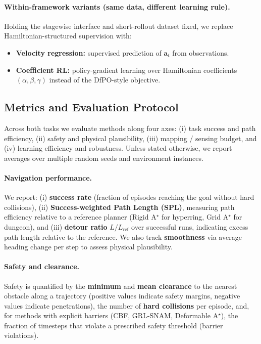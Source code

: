 \paragraph{Within-framework variants (same data, different learning rule).}
Holding the stagewise interface and short-rollout dataset fixed, we replace Hamiltonian-structured supervision with:
\begin{itemize}
    \item \textbf{Velocity regression:} supervised prediction of $\mathbf{a}_t$ from observations.
    \item \textbf{Coefficient RL:} policy-gradient learning over Hamiltonian coefficients $(\alpha,\beta,\gamma)$ instead of the DfPO-style objective.
\end{itemize}


\subsection{Metrics and Evaluation Protocol}
\label{subsec:metrics_protocol}

Across both tasks we evaluate methods along four axes:
(i) task success and path efficiency,
(ii) safety and physical plausibility,
(iii) mapping / sensing budget, and
(iv) learning efficiency and robustness.
Unless stated otherwise, we report averages over multiple random seeds and environment instances.

\paragraph{Navigation performance.}
We report:
(i) \textbf{success rate} (fraction of episodes reaching the goal without hard collisions),
(ii) \textbf{Success-weighted Path Length (SPL)}, measuring path efficiency relative to a reference planner (Rigid A$^{\star}$ for hyperring, Grid A$^{\star}$ for dungeon),
and (iii) \textbf{detour ratio} $L / L_{\mathrm{ref}}$ over successful runs, indicating excess path length relative to the reference. We also track \textbf{smoothness} via average heading change per step to assess physical plausibility.

\paragraph{Safety and clearance.}
Safety is quantified by the \textbf{minimum} and \textbf{mean clearance} to the nearest obstacle along a trajectory (positive values indicate safety margins, negative values indicate penetrations), the number of \textbf{hard collisions} per episode, and, for methods with explicit barriers (CBF, GRL-SNAM, Deformable A$^{\star}$), the fraction of timesteps that violate a prescribed safety threshold (barrier violations).

